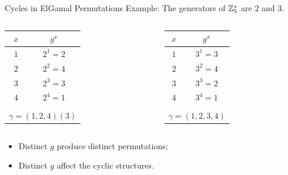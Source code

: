 \begin{frame}{Cycles in ElGamal Permutations}
Example: The generators of $\mathbb{Z}_5^*$ are  $2$ and $3$.

    \begin{columns}
        \begin{column}{0.45\textwidth}
        \centering
    	    \begin{tabular}{c|c}
    	        $x$ & $g^{x} $ \\ \hline \hline
    	        $1$ & $2^{1} = 2$ \\
    	        $2$ & $2^{2} = 4$ \\
    	        $3$ & $2^{3} = 3$ \\
              $4$ & $2^{4} = 1$  \\
                \multicolumn{2}{c}{} \\
              \multicolumn{2}{c}{$\gamma = (1,2,4)(3)$}
    	    \end{tabular}
        \end{column}
        \begin{column}{0.45\textwidth}
    	    \centering
    	    \begin{tabular}{c|c}
    	        $x$ & $g^{x} $ \\ \hline \hline
    	        $1$ & $3^{1} = 3$ \\
    	        $2$ & $3^{2} = 4$ \\
    	        $3$ & $3^{3} = 2$ \\
    	        $4$ & $3^{4} = 1$  \\
                \multicolumn{2}{c}{} \\
              \multicolumn{2}{c}{$\gamma  = (1,2,3,4)$}
    	    \end{tabular}
        \end{column}
  \end{columns}
  \vspace{1cm}
  
  \pause
  \begin{itemize}
      \item Distinct $g$ produce distinct permutations;
      \item Distinct $g$ affect the cyclic structures.
  \end{itemize}
  
\end{frame}

